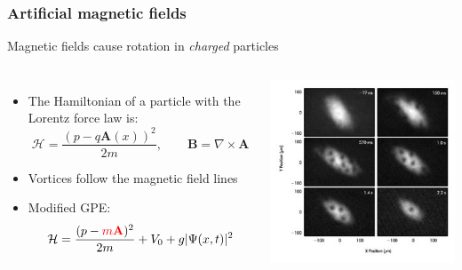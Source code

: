 \documentclass{beamer}
\begin{document}
\begin{frame}
\frametitle{Artificial magnetic fields}
\begin{center}
Magnetic fields cause rotation in \textit{charged} particles
\end{center}
\begin{columns}
\begin{itemize}
\item The Hamiltonian of a particle with the Lorentz force law is:
$$
\mathcal{H} = \frac{(p-q\mathbf{A}(x))^2}{2m}, \qquad \mathbf{B} = \nabla\times\mathbf{A}
$$
\item Vortices follow the magnetic field lines
\item Modified GPE:
\begin{equation*}
\mathcal{ H} = \frac{(p-{\color{red}{m\mathbf{A}}} )^2}{2m} + V_0 + g|\Psi(x,t)|^2
\end{equation*}
\end{itemize}
\includegraphics[width=\textwidth]{exp_synth.jpg}
\end{columns}
\end{frame}
\end{document}
